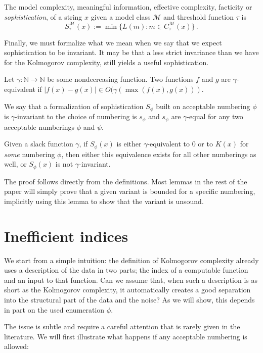 \documentclass{style/llncs}
\newcommand{\M}{\mathscr M}
\newcommand{\N}{\mathbb N}
\newcommand{\s}{S}
\newcommand{\p}{\,\text{.}}
\begin{document}
\begin{definition}[Sophistication]\belowdisplayskip=-12pt
  The model complexity, meaningful information, effective complexity, facticity or \emph{sophistication},  of a string $x$ given a model class $\M$ and threshold function $\tau$ is
  \[
  \s_\tau^{\M}(x):=\min\{L(m):m\in C^\M_\tau(x)\}\p
  \]\label{definition:sophistication}
\end{definition}
Finally, we must formalize what we mean when we say that we expect sophistication to be invariant. It may be that a less strict invariance than we have for the Kolmogorov complexity, still yields a useful sophistication.
\begin{definition}
Let $\gamma:\N\to \N$ be some nondecreasing function. Two functions $f$ and $g$ are $\gamma$-equivalent if $|f(x) - g(x)| \in O(\gamma(\max(f(x), g(x)))$.
\end{definition}
We say that a formalization of sophistication $\s_\phi$ built on acceptable numbering $\phi$ is $\gamma$-invariant to the choice of numbering is $s_\phi$ and $s_\psi$ are $\gamma$-equal for any two acceptable numberings $\phi$ and $\psi$. 
\begin{lemma}\label{lem:broken}
Given a slack function $\gamma$, if $\s_\phi(x)$ is either $\gamma$-equivalent to $0$ or to $K(x)$ for \emph{some} numbering $\phi$, then either this equivalence exists for all other numberings as well, or $\s_\phi(x)$ is not $\gamma$-invariant.
\end{lemma}
The proof follows directly from the definitions. Most lemmas in the rest of the paper will simply prove that a given variant is bounded for a specific numbering, implicitly using this lemma to show that the variant is unsound.

\section{Inefficient indices}
\label{section:indices}
We start from a simple intuition: the definition of Kolmogorov complexity already uses a description of the data in two parts; the index of a computable function and an input to that function. Can we assume that, when such a description is as short as the Kolmogorov complexity, it automatically creates a good separation into the structural part of the data and the noise? As we will show, this depends in part on the used enumeration $\phi$. 

The issue is subtle and require a careful attention that is rarely given in the literature. We will first illustrate what happens if any acceptable numbering is allowed:
\end{document}
